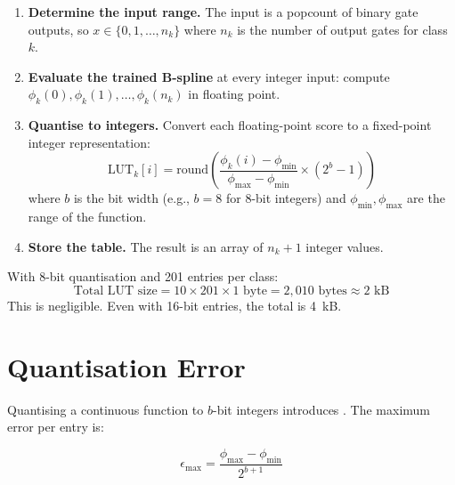 \begin{enumerate}
  \item \textbf{Determine the input range.} The input is a popcount
    of binary gate outputs, so $x \in \{0, 1, \ldots, n_k\}$ where
    $n_k$ is the number of output gates for class $k$.

  \item \textbf{Evaluate the trained B-spline} at every integer
    input: compute $\phi_k(0), \phi_k(1), \ldots, \phi_k(n_k)$ in
    floating point.

  \item \textbf{Quantise to integers.} Convert each floating-point
    score to a fixed-point integer representation:
    \begin{equation}
      \text{LUT}_k[i] = \text{round}\!\left(
        \frac{\phi_k(i) - \phi_{\min}}{\phi_{\max} - \phi_{\min}}
        \times (2^b - 1)\right)
      \label{eq:quantise}
    \end{equation}
    where $b$ is the bit width (e.g., $b = 8$ for 8-bit integers)
    and $\phi_{\min}, \phi_{\max}$ are the range of the function.

  \item \textbf{Store the table.} The result is an array of $n_k + 1$
    integer values.
\end{enumerate}

\begin{engineernote}
With 8-bit quantisation and 201 entries per class:
\[
  \text{Total LUT size} = 10 \times 201 \times 1 \text{ byte}
  = 2{,}010 \text{ bytes} \approx 2 \text{ kB}
\]
This is negligible. Even with 16-bit entries, the total is 4~kB.
\end{engineernote}


\section{Quantisation Error}
\label{sec:quant-error}

Quantising a continuous function to $b$-bit integers introduces
. The maximum error per entry is:

\begin{equation}
  \epsilon_{\max} = \frac{\phi_{\max} - \phi_{\min}}{2^{b+1}}
  \label{eq:quant-error}
\end{equation}


